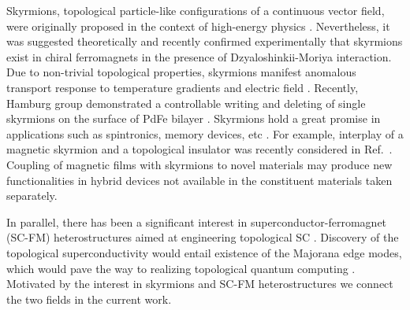 \documentclass[twocolumn,showpacs,floatfix,longbibliography]{revtex4-1}
\begin{document}
Skyrmions, topological particle-like configurations of a continuous vector field, were originally proposed in the context of high-energy physics \cite{Skyrme}.  Nevertheless, it was suggested theoretically \cite{Bogdanov1989,Rossler2006} and recently confirmed experimentally \cite{Muhlbauer2009,Munzer2010,Yu2011,Heinze2011,Seki2012} that skyrmions exist in chiral ferromagnets in the presence of Dzyaloshinkii-Moriya interaction. Due to non-trivial topological properties, skyrmions manifest anomalous transport response to temperature gradients \cite{Jonietz2010} and electric field \cite{Neubauer2009,Zang2011,Saxena2013}. Recently, Hamburg group demonstrated a controllable writing and deleting of single skyrmions on the surface of PdFe bilayer \cite{Romming2013,Bergmann2014,Romming2015}.  Skyrmions hold a great promise in applications such as spintronics, memory devices, etc \cite{Fert2013,Nagaosa2013}. For example, interplay of a magnetic skyrmion and a topological insulator was recently considered in Ref.~\cite{Hurst2015}. Coupling of magnetic films with skyrmions to novel materials may produce new functionalities in hybrid devices not available in the constituent materials taken separately.


In parallel, there has been a significant interest in superconductor-ferromagnet (SC-FM) heterostructures aimed at engineering topological SC \cite{Alicea2012,Beenakker}. Discovery of the topological superconductivity would entail existence of the Majorana edge modes, which would pave the way to realizing topological quantum computing \cite{Nayak2008}. Motivated by the interest in skyrmions and SC-FM heterostructures  we connect the two fields in the current work. 
\end{document}
